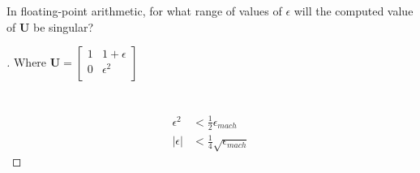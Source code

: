 \documentclass[12pt]{article}
\newenvironment{exercise}[2][Exercise]{\begin{trivlist}
\item[\hskip \labelsep {\bfseries #1}\hskip \labelsep {\bfseries #2.}]}{\end{trivlist}}
\begin{document}
\begin{exercise}{4} 
	In floating-point arithmetic, for what range of values of $\epsilon$ will the computed value of $\bm{U}$ be singular?
\end{exercise}

\begin{proof}[]
	Where $\bm{U} = 
		\begin{bmatrix}
			1 & 1+\epsilon \\
			0 & \epsilon^2 \\
		\end{bmatrix} $\\
	 \\
	 \\
	\begin{align*}
		\epsilon^2 &< \frac{1}{2}\epsilon_{mach} \\
		|\epsilon| &< \frac{1}{4}\sqrt{\epsilon_{mach}}
	\end{align*}
\end{proof}
\end{document}
